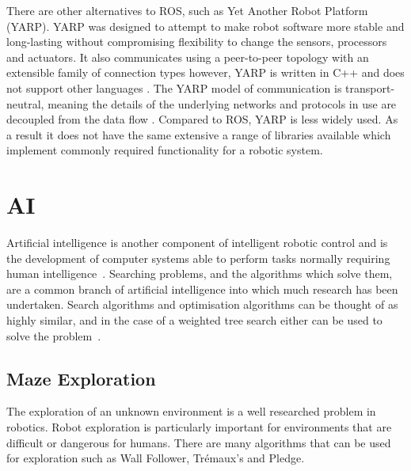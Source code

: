 There are other alternatives to ROS, such as Yet Another Robot Platform 
(YARP). YARP was designed to attempt to make robot software more stable 
and long-lasting without compromising flexibility to change the sensors, 
processors and actuators. It also communicates using a peer-to-peer 
topology with an extensible family of connection types however, YARP is 
written in C++ and does not support other languages \cite{aboutYARP}.
The YARP model of communication is transport-neutral, meaning the details 
of the underlying networks and protocols in use are decoupled from the 
data flow \cite{exactlyIsYARP}. Compared to ROS, YARP is less widely used.
As a result it does not have the same extensive a range of libraries available 
which implement commonly required functionality for a robotic system.

\section{AI}\label{litreview/maze}
Artificial intelligence is another component of intelligent robotic control and is the development of computer systems able to perform tasks normally requiring human intelligence~\cite{russell2016artificial}. Searching problems, and the algorithms which solve them, are a common branch of artificial intelligence into which much research has been undertaken. Search algorithms and optimisation algorithms can be thought of as highly similar, and in the case of a weighted tree search either can be used to solve the problem~\cite{kanal2012search}. 
\subsection{Maze Exploration}\label{litreview/maze/exploration}
The exploration of an unknown environment is a well researched problem in 
robotics. Robot exploration is particularly important for 
environments that are difficult or dangerous for humans. There are many
algorithms that can be used for exploration such as Wall Follower, 
Trémaux's and Pledge.

